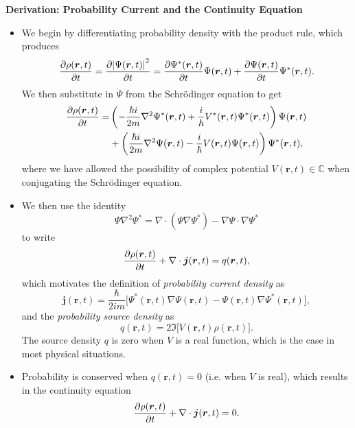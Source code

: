 \documentclass[11pt, a4paper]{article}
\renewcommand{\div}{\nabla \cdot}
\renewcommand{\grad}{\nabla}
\renewcommand{\laplacian}{\nabla^{2}}
\newcommand{\Schro}{Schr\"{o}dinger\xspace}
\renewcommand{\vec}[1]{\bm{#1}}  %
\renewcommand{\r}{\vec{r}}  %
\renewcommand{\P}{\Psi}  %
\begin{document}
\textbf{Derivation: Probability Current and the Continuity Equation}
\begin{itemize}

	\item We begin by differentiating probability density with the product rule, which produces
	\begin{equation*}
		  \pdv{\rho(\r, t)}{t} = \pdv{\abs{\P(\r, t)}^{2}}{t} = \pdv{\P^{*}(\r, t)}{t} \P(\r, t) + \pdv{\P(\r, t)}{t} \P^{*}(\r, t).
	\end{equation*}
	We then substitute in $ \dot{\P} $ from the \Schro equation to get
	\begin{align*}
		\pdv{\rho(\r, t)}{t} = &\left(- \frac{\hbar i}{2m}\laplacian \P^{*}(\r, t) + \frac{i}{\hbar} V^{*}(\r, t)\Psi^{*}(\r, t)\right)\P(\r, t) \\
		& + \left(\frac{\hbar i}{2m}\laplacian \P(\r, t) - \frac{i}{\hbar} V(\r, t)\Psi(\r, t)\right)\Psi^{*}(\r, t),
	\end{align*}
	where we have allowed the possibility of complex potential $ V(\r, t) \in \mathbb{C} $ when conjugating the \Schro equation. 

    \item We then use the identity
	\begin{equation*}
		\P \laplacian \P^{*} = \div (\P \grad \P^{*}) - \grad \P \cdot \grad \P^{*}
	\end{equation*}
	to write 
	\begin{equation*}
		\pdv{\rho(\r, t)}{t} + \div \vec{j}(\r, t) = q(\r, t),
	\end{equation*}
	which motivates the definition of \textit{probability current density} as
	\begin{equation*}
		\vec{j}(\r, t) = \frac{\hbar}{2im}\big[\P^{*}(\r, t)\grad\P(\r, t) - \P(\r, t)\grad\P^{*}(\r, t)\big],
	\end{equation*}
	and the \textit{probability source density} as
	\begin{equation*}
		q(\r, t) = 2 \Im \big[V(\r, t)\rho(\r, t)\big].
	\end{equation*}
	The source density $ q $ is zero when $ V $ is a real function, which is the case in most physical situations.
	
    \item Probability is conserved when $ q(\r, t) = 0 $ (i.e. when $ V $ is real), which results in the continuity equation
	\begin{equation*}
		\pdv{\rho(\r, t)}{t} + \div \vec{j}(\r, t) = 0.
	\end{equation*}
	
\end{itemize}
\end{document}
